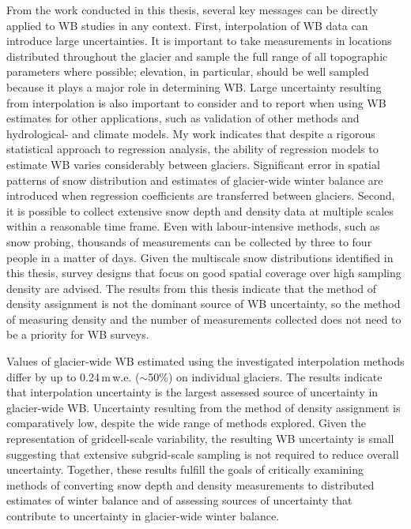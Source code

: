 \documentclass{sfuthesis}
\begin{document}
From the work conducted in this thesis, several key messages can be directly applied to WB studies in any context. First, interpolation of WB data can introduce large uncertainties. It is important to take measurements in locations distributed throughout the glacier and sample the full range of all topographic parameters where possible; elevation, in particular, should be well sampled because it plays a major role in determining WB. Large uncertainty resulting from interpolation is also important to consider and to report when using WB estimates for other applications, such as validation of other methods and hydrological- and climate models. My work indicates that despite a rigorous statistical approach to regression analysis, the ability of regression models to estimate WB varies considerably between glaciers. Significant error in spatial patterns of snow distribution and estimates of glacier-wide winter balance are introduced when regression coefficients are transferred between glaciers. Second, it is possible to collect extensive snow depth and density data at multiple scales within a reasonable time frame. Even with labour-intensive methods, such as snow probing, thousands of measurements can be collected by three to four people in a matter of days. Given the multiscale snow distributions identified in this thesis, survey designs that focus on good spatial coverage over high sampling density are advised. The results from this thesis indicate that the method of density assignment is not the dominant source of WB uncertainty, so the method of measuring density and the number of measurements collected does not need to be a priority for WB surveys.  

Values of glacier-wide WB estimated using the investigated interpolation methods differ by up to 0.24\,m\,w.e. ($\sim$50\%) on individual glaciers. The results indicate that interpolation uncertainty is the largest assessed source of uncertainty in glacier-wide WB. Uncertainty resulting from the method of density assignment is comparatively low, despite the wide range of methods explored. Given the representation of gridcell-scale variability, the resulting WB uncertainty is small suggesting that extensive subgrid-scale sampling is not required to reduce overall uncertainty. Together, these results fulfill the goals of critically examining methods of converting snow depth and density measurements to distributed estimates of winter balance and of assessing sources of uncertainty that contribute to uncertainty in glacier-wide winter balance. 
\end{document}
